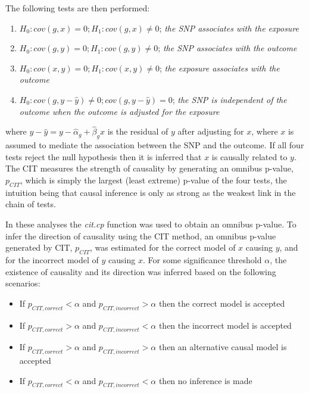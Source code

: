 \documentclass[]{article}
\providecommand{\tightlist}{%
  \setlength{\itemsep}{0pt}\setlength{\parskip}{0pt}}
\begin{document}
The following tests are then performed:

\begin{enumerate}
\def\labelenumi{\arabic{enumi}.}
\tightlist
\item
  \(H_0: cov(g, x) = 0; H_1: cov(g, x) \neq 0\); \emph{the SNP
  associates with the exposure}
\item
  \(H_0: cov(g, y) = 0; H_1: cov(g, y) \neq 0\); \emph{the SNP
  associates with the outcome}
\item
  \(H_0: cov(x, y) = 0; H_1: cov(x, y) \neq 0\); \emph{the exposure
  associates with the outcome}
\item
  \(H_0: cov(g, y - \hat{y}) \neq 0; cov(g, y - \hat{y}) = 0\);
  \emph{the SNP is independent of the outcome when the outcome is
  adjusted for the exposure}
\end{enumerate}

where \(y - \hat{y} = y - \hat{\alpha}_g + \hat{\beta}_g x\) is the
residual of \(y\) after adjusting for \(x\), where \(x\) is assumed to
mediate the association between the SNP and the outcome. If all four
tests reject the null hypothesis then it is inferred that \(x\) is
causally related to \(y\). The CIT measures the strength of causality by
generating an omnibus p-value, \(p_{CIT}\), which is simply the largest
(least extreme) p-value of the four tests, the intuition being that
causal inference is only as strong as the weakest link in the chain of
tests.

In these analyses the \emph{cit.cp} function was used to obtain an
omnibus p-value. To infer the direction of causality using the CIT
method, an omnibus p-value generated by CIT, \(p_{CIT}\), was estimated
for the correct model of \(x\) causing \(y\), and for the incorrect
model of \(y\) causing \(x\). For some significance threshold
\(\alpha\), the existence of causality and its direction was inferred
based on the following scenarios:

\begin{itemize}
\tightlist
\item
  If \(p_{CIT,correct} < \alpha\) and \(p_{CIT,incorrect} > \alpha\)
  then the correct model is accepted
\item
  If \(p_{CIT,correct} > \alpha\) and \(p_{CIT,incorrect} < \alpha\)
  then the incorrect model is accepted
\item
  If \(p_{CIT,correct} > \alpha\) and \(p_{CIT,incorrect} > \alpha\)
  then an alternative causal model is accepted
\item
  If \(p_{CIT,correct} < \alpha\) and \(p_{CIT,incorrect} < \alpha\)
  then no inference is made
\end{itemize}
\end{document}
